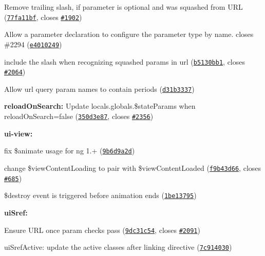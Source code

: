 {{\begin{DoxyItemize}
\begin{DoxyItemize}
\item Remove trailing slash, if parameter is optional and was squashed from U\+RL (\href{https://github.com/angular-ui/ui-router/commit/77fa11bf0787d0f6da97ab0003ab29afb7411391}{\tt 77fa11bf}, closes \href{https://github.com/angular-ui/ui-router/issues/1902}{\tt \#1902})
\item Allow a parameter declaration to configure the parameter type by name. closes \#2294 (\href{https://github.com/angular-ui/ui-router/commit/e40102492d40fe1cf6ba14d955fcc9f345c16458}{\tt e4010249})
\item include the slash when recognizing squashed params in url (\href{https://github.com/angular-ui/ui-router/commit/b5130bb1215e15f832ea6daa670410b9a950c0d4}{\tt b5130bb1}, closes \href{https://github.com/angular-ui/ui-router/issues/2064}{\tt \#2064})
\item Allow url query param names to contain periods (\href{https://github.com/angular-ui/ui-router/commit/d31b3337cc2ce71d87c92fdded629e46558d0b49}{\tt d31b3337})
\end{DoxyItemize}
\item {\bfseries reload\+On\+Search\+:} Update {\ttfamily locals.\+globals.\$state\+Params} when reload\+On\+Search=false (\href{https://github.com/angular-ui/ui-router/commit/350d3e87783a2263fd7d23913da34f1268c3300b}{\tt 350d3e87}, closes \href{https://github.com/angular-ui/ui-router/issues/2356}{\tt \#2356})
\item {\bfseries ui-\/view\+:}
\begin{DoxyItemize}
\item fix \$animate usage for ng 1.+ (\href{https://github.com/angular-ui/ui-router/commit/9b6d9a2d0ce4ae08384165cb517bddea59b67892}{\tt 9b6d9a2d})
\item change \$view\+Content\+Loading to pair with \$view\+Content\+Loaded (\href{https://github.com/angular-ui/ui-router/commit/f9b43d66833f0e17de41fd8d1cc3b491e3ba4a0e}{\tt f9b43d66}, closes \href{https://github.com/angular-ui/ui-router/issues/685}{\tt \#685})
\item \$destroy event is triggered before animation ends (\href{https://github.com/angular-ui/ui-router/commit/1be13795686ab78abb2d5094bc8addcacb928975}{\tt 1be13795})
\end{DoxyItemize}
\item {\bfseries ui\+Sref\+:}
\begin{DoxyItemize}
\item Ensure U\+RL once param checks pass (\href{https://github.com/angular-ui/ui-router/commit/9dc31c5465328e5666468b0c2319ce205f4b72f8}{\tt 9dc31c54}, closes \href{https://github.com/angular-ui/ui-router/issues/2091}{\tt \#2091})
\item ui\+Sref\+Active\+: update the active classes after linking directive (\href{https://github.com/angular-ui/ui-router/commit/7c914030f13e05e45a941c1b723cb785db729890}{\tt 7c914030})
\end{DoxyItemize}
\end{DoxyItemize}}}

